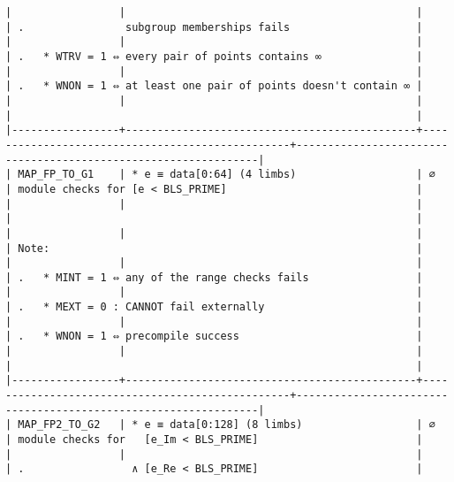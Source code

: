 \documentclass[varwidth=\maxdimen,margin=0.5cm,multi={verbatim}]{standalone}
\begin{document}
\begin{verbatim}
|                 |                                              |                                                 | .                subgroup memberships fails                    |
|                 |                                              |                                                 | .   * WTRV = 1 ⇔ every pair of points contains ∞               |
|                 |                                              |                                                 | .   * WNON = 1 ⇔ at least one pair of points doesn't contain ∞ |
|                 |                                              |                                                 |                                                                |
|-----------------+----------------------------------------------+-------------------------------------------------+----------------------------------------------------------------|
| MAP_FP_TO_G1    | * e ≡ data[0:64] (4 limbs)                   | ∅                                               | module checks for [e < BLS_PRIME]                              |
|                 |                                              |                                                 |                                                                |
|                 |                                              |                                                 | Note:                                                          |
|                 |                                              |                                                 | .   * MINT = 1 ⇔ any of the range checks fails                 |
|                 |                                              |                                                 | .   * MEXT = 0 : CANNOT fail externally                        |
|                 |                                              |                                                 | .   * WNON = 1 ⇔ precompile success                            |
|                 |                                              |                                                 |                                                                |
|-----------------+----------------------------------------------+-------------------------------------------------+----------------------------------------------------------------|
| MAP_FP2_TO_G2   | * e ≡ data[0:128] (8 limbs)                  | ∅                                               | module checks for   [e_Im < BLS_PRIME]                         |
|                 |                                              |                                                 | .                 ∧ [e_Re < BLS_PRIME]                         |

\end{verbatim}
\end{document}
